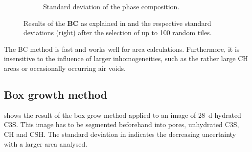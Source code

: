 \begin{figure}[H]
\begin{subfigure}[t]{0.49\linewidth}
      \caption{Standard deviation of the phase composition.}
      \label{fig:lit_box_count_b}
    \end{subfigure}
    \caption{
        Results of the \textbf{\ac{BC}} as explained in \cite{mouret.2001,hlavacek.2015} and the respective standard deviations (right) after the selection of up to \num{100} random tiles.
    }
    \label{fig:lit_box_count}
\end{figure}

The \ac{BC} method is fast and works well for area calculations.
Furthermore, it is insensitive to the influence of larger inhomogeneities, such as the rather large \ac{CH} areas or occasionally occurring air voids.


\subsection{Box growth method}

 shows the result of the box grow method applied to an image of \qty{28}{\day} hydrated \ac{C3S}.
This image has to be segmented beforehand into pores, unhydrated \ac{C3S}, \ac{CH} and \ac{CSH}.
The standard deviation in  indicates the decreasing uncertainty with a larger area analysed.

